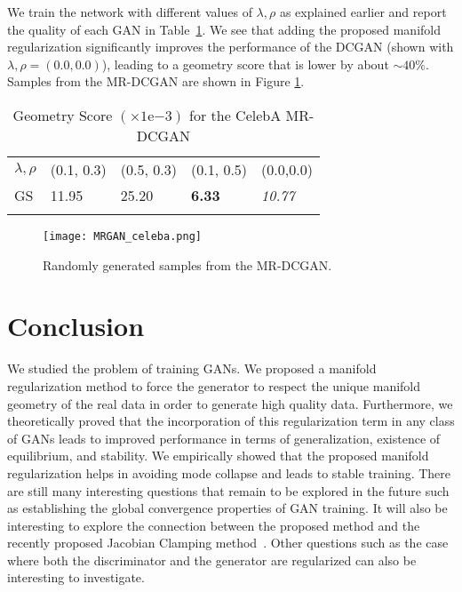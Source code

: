 \documentclass[10pt,twocolumn,letterpaper]{article}
\begin{document}
 We train the network with different values of $\lambda, \rho$ as explained earlier and report the quality of each GAN in Table~\ref{tab:dcgan}. We see that adding the proposed manifold regularization significantly improves the performance of the DCGAN (shown with $\lambda,\rho = (0.0, 0.0)$), leading to a geometry score that is lower by about $\sim 40\%$. Samples from the MR-DCGAN are shown in Figure \ref{fig:celeba_results}.

\begin{table}[h]
\centering
\caption{Geometry Score $(\times 1\mathrm{e}{-3})$ for the CelebA MR-DCGAN}
\begin{tabular}{p{1.3cm}p{1.3cm}p{1.3cm}p{1.3cm}p{1.3cm}}
\hline
$\lambda,\rho$ & (0.1, 0.3) & (0.5, 0.3) & (0.1, 0.5)  & (0.0,0.0) \\
GS &11.95 &25.20 &  \textbf{6.33} & {\textit{10.77}} \\\hline
\label{tab:dcgan}
\end{tabular}
\end{table}
\begin{figure}
    \centering
    \texttt{[image: MRGAN\_celeba.png]}
    \caption{\small{Randomly generated samples from the MR-DCGAN.}}
    \label{fig:celeba_results}
\end{figure}

\vspace{-0.1in}
\section{Conclusion}
We studied the problem of training GANs. We proposed a manifold regularization method to force the generator to respect the unique manifold geometry of the real data in order to generate high quality data. Furthermore, we theoretically proved that the incorporation of this regularization term in any class of GANs leads to improved performance in terms of generalization, existence of equilibrium, and stability. We empirically showed that the proposed manifold regularization helps in avoiding mode collapse and leads to stable training. There are still many interesting questions that remain to be explored in the future such as establishing the global convergence properties of GAN training. It will also be interesting to explore the connection between the proposed method and the recently proposed Jacobian Clamping method~\cite{jacob_clip}. Other questions such as the case where both the discriminator and the generator are regularized can also be interesting to investigate.
\end{document}

